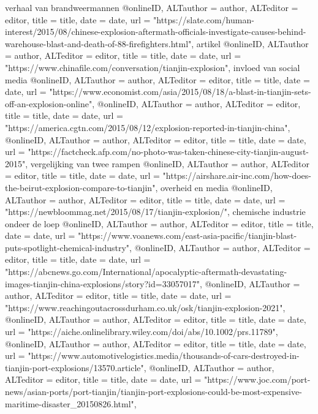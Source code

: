 {{{{{{verhaal van brandweermannen
@online{ID,	ALTauthor = {author},	ALTeditor = {editor},	title = {title},	date = {date},	url = {"https://slate.com/human-interest/2015/08/chinese-explosion-aftermath-officials-investigate-causes-behind-warehouse-blast-and-death-of-88-firefighters.html"},}
artikel
@online{ID,	ALTauthor = {author},	ALTeditor = {editor},	title = {title},	date = {date},	url = {"https://www.chinafile.com/conversation/tianjin-explosion"},}
invloed van social media
@online{ID,	ALTauthor = {author},	ALTeditor = {editor},	title = {title},	date = {date},	url = {"https://www.economist.com/asia/2015/08/18/a-blast-in-tianjin-sets-off-an-explosion-online"},}
@online{ID,	ALTauthor = {author},	ALTeditor = {editor},	title = {title},	date = {date},	url = {"https://america.cgtn.com/2015/08/12/explosion-reported-in-tianjin-china"},}
@online{ID,	ALTauthor = {author},	ALTeditor = {editor},	title = {title},	date = {date},	url = {"https://factcheck.afp.com/no-photo-was-taken-chinese-city-tianjin-august-2015"},}
vergelijking van twee rampen
@online{ID,	ALTauthor = {author},	ALTeditor = {editor},	title = {title},	date = {date},	url = {"https://airshare.air-inc.com/how-does-the-beirut-explosion-compare-to-tianjin"},}
overheid en media
@online{ID,	ALTauthor = {author},	ALTeditor = {editor},	title = {title},	date = {date},	url = {"https://newbloommag.net/2015/08/17/tianjin-explosion/"},}
chemische industrie ondeer de loep
@online{ID,	ALTauthor = {author},	ALTeditor = {editor},	title = {title},	date = {date},	url = {"https://www.voanews.com/east-asia-pacific/tianjin-blast-puts-spotlight-chemical-industry"},}
@online{ID,	ALTauthor = {author},	ALTeditor = {editor},	title = {title},	date = {date},	url = {"https://abcnews.go.com/International/apocalyptic-aftermath-devastating-images-tianjin-china-explosions/story?id=33057017"},}
@online{ID,	ALTauthor = {author},	ALTeditor = {editor},	title = {title},	date = {date},	url = {"https://www.reachingoutacrossdurham.co.uk/osk/tianjin-explosion-2021"},}
@online{ID,	ALTauthor = {author},	ALTeditor = {editor},	title = {title},	date = {date},	url = {"https://aiche.onlinelibrary.wiley.com/doi/abs/10.1002/prs.11789"},}
@online{ID,	ALTauthor = {author},	ALTeditor = {editor},	title = {title},	date = {date},	url = {"https://www.automotivelogistics.media/thousands-of-cars-destroyed-in-tianjin-port-explosions/13570.article"},}
@online{ID,	ALTauthor = {author},	ALTeditor = {editor},	title = {title},	date = {date},	url = {"https://www.joc.com/port-news/asian-ports/port-tianjin/tianjin-port-explosions-could-be-most-expensive-maritime-disaster_20150826.html"},}
}}}}}}
